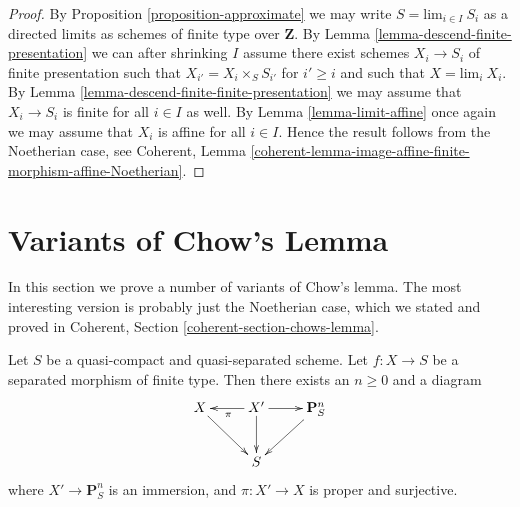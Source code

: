 \begin{proof}
\medskip\noindent
By Proposition \ref{proposition-approximate} we may write
$S = \text{lim}_{i \in I}\ S_i$ as
a directed limits as schemes of finite type over $\mathbf{Z}$.
By Lemma \ref{lemma-descend-finite-presentation} we can
after shrinking $I$ assume there exist schemes $X_i \to S_i$
of finite presentation such that $X_{i'} = X_i \times_S S_{i'}$
for $i' \geq i$ and such that $X = \text{lim}_i\ X_i$. By
Lemma \ref{lemma-descend-finite-finite-presentation} we may
assume that $X_i \to S_i$ is finite for all $i \in I$ as well.
By Lemma \ref{lemma-limit-affine} once again we may assume that $X_i$ is
affine for all $i \in I$. Hence the result follows from the
Noetherian case, see Coherent,
Lemma \ref{coherent-lemma-image-affine-finite-morphism-affine-Noetherian}.
\end{proof}


























\section{Variants of Chow's Lemma}
\label{section-chows-lemma}

\noindent
In this section we prove a number of variants of Chow's lemma.
The most interesting version is probably just the Noetherian
case, which we stated and proved in
Coherent, Section \ref{coherent-section-chows-lemma}.

\begin{lemma}
\label{lemma-chow-finite-type}
Let $S$ be a quasi-compact and quasi-separated scheme.
Let $f : X \to S$ be a separated morphism of finite type.
Then there exists an $n \geq 0$ and a diagram
$$
\xymatrix{
X \ar[rd] & X' \ar[d] \ar[l]^\pi \ar[r] & \mathbf{P}^n_S \ar[dl] \\
& S &
}
$$
where $X' \to \mathbf{P}^n_S$ is an immersion, and
$\pi : X' \to X$ is proper and surjective.
\end{lemma}

